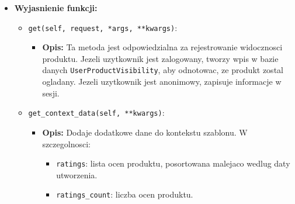 \documentclass[12pt,a4paper,oneside]{article}
\theoremstyle{definition}
\numberwithin{equation}{section}
\begin{document}
\begin{itemize}
    \item \textbf{Wyjasnienie funkcji:}
        \begin{itemize}
            \item \texttt{get(self, request, *args, **kwargs)}:
            \begin{itemize}
                \item \textbf{Opis:} Ta metoda jest odpowiedzialna za rejestrowanie widocznosci produktu. Jezeli uzytkownik jest zalogowany,
                tworzy wpis w bazie danych \texttt{UserProductVisibility}, aby odnotowac, ze produkt zostal ogladany. Jezeli uzytkownik jest anonimowy, zapisuje informacje w sesji.
            \end{itemize}
            \item \texttt{get\_context\_data(self, **kwargs)}:
            \begin{itemize}
                \item \textbf{Opis:} Dodaje dodatkowe dane do kontekstu szablonu. W szczegolnosci:
                \begin{itemize}
                    \item \texttt{ratings}: lista ocen produktu, posortowana malejaco wedlug daty utworzenia.
                    \item \texttt{ratings\_count}: liczba ocen produktu.
                \end{itemize}
            \end{itemize}
        \end{itemize}


\end{itemize}
\end{document}
